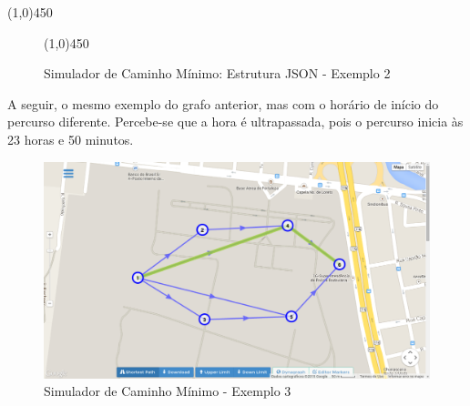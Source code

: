 \begin{center}
  \line(1,0){450}
\end{center}

\begin{figure}[htbp]
  \begin{center}
    \line(1,0){450}
  \end{center}
  \centering
  \caption{Simulador de Caminho Mínimo: Estrutura JSON - Exemplo 2}
  \label{fig:jsondyn2}
\end{figure}
\FloatBarrier

A seguir, o mesmo exemplo do grafo anterior, mas com o horário de início do percurso diferente.
Percebe-se que a hora é ultrapassada, pois o percurso inicia às 23 horas e 50 minutos.

\begin{figure}[htbp]
\centering
 \includegraphics[width=.70\textwidth]{chapters/fig/validacao/ex3.png}
\caption{Simulador de Caminho Mínimo - Exemplo 3}
\label{fig:ex2}
\end{figure}
\FloatBarrier

